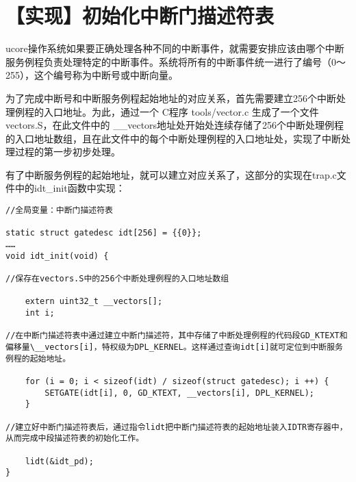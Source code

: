 \section{【实现】初始化中断门描述符表}\label{ux5b9eux73b0ux521dux59cbux5316ux4e2dux65adux95e8ux63cfux8ff0ux7b26ux8868}

ucore操作系统如果要正确处理各种不同的中断事件，就需要安排应该由哪个中断服务例程负责处理特定的中断事件。系统将所有的中断事件统一进行了编号（0～255），这个编号称为中断号或中断向量。

为了完成中断号和中断服务例程起始地址的对应关系，首先需要建立256个中断处理例程的入口地址。为此，通过一个
C程序 tools/vector.c 生成了一个文件vectors.S，在此文件中的
\_\_vectors地址处开始处连续存储了256个中断处理例程的入口地址数组，且在此文件中的每个中断处理例程的入口地址处，实现了中断处理过程的第一步初步处理。

有了中断服务例程的起始地址，就可以建立对应关系了，这部分的实现在trap.c文件中的idt\_init函数中实现：

\begin{lstlisting}
//全局变量：中断门描述符表

static struct gatedesc idt[256] = {{0}};
……
void idt_init(void) {

//保存在vectors.S中的256个中断处理例程的入口地址数组

    extern uint32_t __vectors[];
    int i;
  
//在中断门描述符表中通过建立中断门描述符，其中存储了中断处理例程的代码段GD_KTEXT和偏移量\__vectors[i]，特权级为DPL_KERNEL。这样通过查询idt[i]就可定位到中断服务例程的起始地址。

    for (i = 0; i < sizeof(idt) / sizeof(struct gatedesc); i ++) {
        SETGATE(idt[i], 0, GD_KTEXT, __vectors[i], DPL_KERNEL);
    }
  
//建立好中断门描述符表后，通过指令lidt把中断门描述符表的起始地址装入IDTR寄存器中，从而完成中段描述符表的初始化工作。

    lidt(&idt_pd);
}
\end{lstlisting}


